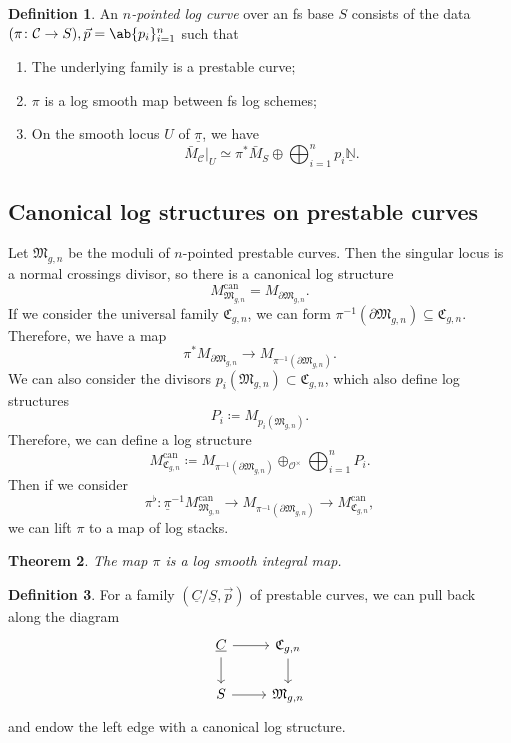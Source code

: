 \documentclass{amsart}
\newtheorem{thm}{Theorem}[section]
\theoremstyle{definition}
\newtheorem{defn}[thm]{Definition}
\theoremstyle{remark}
\theoremstyle{plain}
\theoremstyle{definition}
\theoremstyle{remark}
\newcommand{\N}{\mathbb{N}}
\newcommand{\mc}[1]{\mathcal{#1}}
\newcommand{\mf}[1]{\mathfrak{#1}}
\newcommand{\on}[1]{\operatorname{#1}}
\newcommand{\ul}[1]{\underline{#1}}
\newcommand{\1}{\mathbf{1}}
\newcommand{\2}{\mathbf{2}}
\newcommand{\3}{\mathbf{3}}
\begin{document}
\begin{defn}
    An \textit{\(n\)-pointed log curve} over an fs base \(S\) consists of the data \((\pi \colon \mc{C} \to S), \vec{p} = \ab\{p_i\}_{i=1}^n\) such that
    \begin{enumerate}
        \item The underlying family is a prestable curve;
        \item \(\pi\) is a log smooth map between fs log schemes;
        \item On the smooth locus \(U\) of \(\ul{\pi}\), we have
            \[ \bar{M}_{\mc{C}}|_U \simeq \pi^* \bar{M}_S \oplus \bigoplus_{i=1}^n p_i \ul{\N}. \]
    \end{enumerate}
\end{defn}

\subsection{Canonical log structures on prestable curves}%
\label{sub:Canonical log structures on prestable curves}

Let \(\mf{M}_{g,n}\) be the moduli of \(n\)-pointed prestable curves. Then the singular locus is a normal crossings divisor, so there is a canonical log structure
\[ M_{\mf{M}_{g,n}}^{\on{can}} = M_{\partial \mf{M}_{g,n}}. \]
If we consider the universal family \(\mf{C}_{g,n}\), we can form \(\pi^{-1}(\partial \mf{M}_{g,n}) \subseteq \mf{C}_{g,n}\). Therefore, we have a map
\[ \pi^* M_{\partial \mf{M}_{g,n}} \to M_{\pi^{-1}(\partial \mf{M}_{g,n})}. \]
We can also consider the divisors \(p_i(\mf{M}_{g,n}) \subset \mf{C}_{g,n}\), which also define log structures
\[ P_i \coloneqq M_{p_i(\mf{M}_{g,n})}. \]
Therefore, we can define a log structure
\[ M_{\mf{C}_{g,n}}^{\on{can}} \coloneqq M_{\pi^{-1}(\partial\mf{M}_{g,n})} \oplus_{\mc{O}^{\times}} \bigoplus_{i=1}^n P_i. \]
Then if we consider
\[ \pi^{\flat} \colon \ul{\pi}^{-1} M_{\mf{M}_{g,n}}^{\on{can}} \to M_{\pi^{-1}(\partial \mf{M}_{g,n})} \to M_{\mf{C}_{g,n}}^{\on{can}}, \]
we can lift \(\pi\) to a map of log stacks.

\begin{thm}
    The map \(\pi\) is a log smooth integral map.
\end{thm}

\begin{defn}
    For a family \((\ul{C}/\ul{S}, \vec{p})\) of prestable curves, we can pull back along the diagram
    \begin{equation*}
    \begin{tikzcd}
        \ul{C} \ar{r} \ar{d} & \mf{C}_{g,n} \ar{d} \\
        S \ar{r} & \mf{M}_{g,n}
    \end{tikzcd}
    \end{equation*}
    and endow the left edge with a canonical log structure.
\end{defn}
\end{document}
